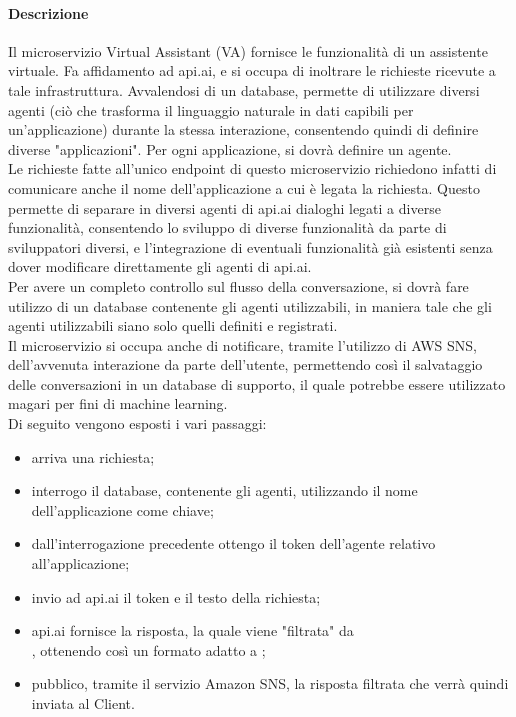 \paragraph{Descrizione}
Il microservizio Virtual Assistant (VA) fornisce le funzionalità di un assistente virtuale. Fa affidamento ad api.ai, e si occupa di inoltrare le richieste ricevute a tale infrastruttura. Avvalendosi di un database, permette di utilizzare diversi agenti (ciò che trasforma il linguaggio naturale in dati capibili per un'applicazione) durante la stessa interazione, consentendo quindi di definire diverse "applicazioni". Per ogni applicazione, si dovrà definire un agente.\\ Le richieste fatte all'unico endpoint di questo microservizio richiedono infatti di comunicare anche il nome dell'applicazione a cui è legata la richiesta. Questo permette di separare in diversi agenti di api.ai dialoghi legati a diverse funzionalità, consentendo lo sviluppo di diverse funzionalità da parte di sviluppatori diversi, e l'integrazione di eventuali funzionalità già esistenti senza dover modificare direttamente gli agenti di api.ai. \\
Per avere un completo controllo sul flusso della conversazione, si dovrà fare utilizzo di un database contenente gli agenti utilizzabili, in maniera tale che gli agenti utilizzabili siano solo quelli definiti e registrati.\\
Il microservizio si occupa anche di notificare, tramite l'utilizzo di AWS SNS, dell'avvenuta interazione da parte dell'utente, permettendo così il salvataggio delle conversazioni in un database di supporto, il quale potrebbe essere utilizzato magari per fini di machine learning.\\
Di seguito vengono esposti i vari passaggi:
\begin{itemize}
	\item arriva una richiesta;
	\item interrogo il database, contenente gli agenti, utilizzando il nome dell'applicazione come chiave;
	\item dall'interrogazione precedente ottengo il token dell'agente relativo all'applicazione;
	\item invio ad api.ai il token e il testo della richiesta;
	\item api.ai fornisce la risposta, la quale viene "filtrata" da\\ , ottenendo così un formato adatto a ;
	\item pubblico, tramite il servizio Amazon SNS, la risposta filtrata che verrà quindi inviata al Client.
\end{itemize}
